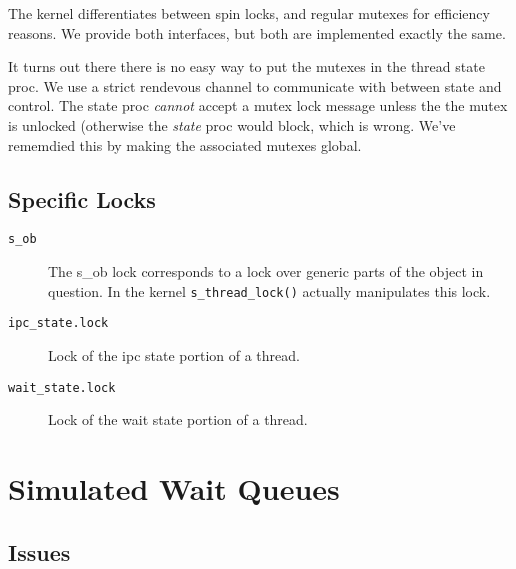 The kernel differentiates between spin locks, and regular mutexes for
efficiency reasons.  We provide both interfaces, but both are
implemented exactly the same.


It turns out there there is no easy way to put the mutexes in the
thread state proc.  We use a strict rendevous channel to communicate
with between state and control.  The state proc {\em cannot} accept a
mutex lock message unless the the mutex is unlocked (otherwise the
{\em state} proc would block, which is wrong.  We've rememdied this by
making the associated mutexes global.

\subsection{Specific Locks}
\label{Locks}

\begin{description}
\item[{\tt s_ob}] 
The s_ob lock corresponds to a lock over generic parts of the object
in question.  In the kernel {\tt s_thread_lock()} actually manipulates
this lock.

\item[{\tt ipc_state.lock}]
Lock of the ipc state portion of a thread.

\item[{\tt wait_state.lock}]
Lock of the wait state portion of a thread. 

\end{description} 


\section{Simulated Wait Queues}

\subsection{Issues}


